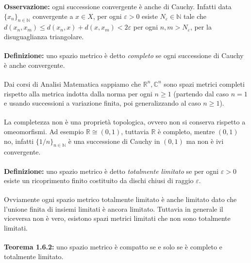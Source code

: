 \documentclass{article}
\begin{document}
\textbf{Osservazione:} ogni successione convergente è anche di Cauchy. Infatti data $\{x_n\}_{n \in \mathbb{N}}$ convergente a $x \in X$, per ogni $\varepsilon > 0$ esiste $N_\varepsilon \in \mathbb{N}$ tale che $d(x_n, x_m) \leq d(x_n, x) + d(x, x_m) < 2\varepsilon$ per ogni $n, m > N_\varepsilon$, per la disuguaglianza triangolare. \\ \\
\textbf{Definizione:} uno spazio metrico è detto \textit{completo} se ogni successione di Cauchy è anche convergente. \\ \\
Dai corsi di Analisi Matematica sappiamo che $\mathbb{R}^n, \mathbb{C}^n$ sono spazi metrici completi rispetto alla metrica indotta dalla norma per ogni $n \geq 1$ (partendo dal caso $n = 1$ e usando successioni a variazione finita, poi generalizzando al caso $n \geq 1$). \\ \\
La completezza non è una proprietà topologica, ovvero non si conserva rispetto a omeomorfismi. Ad esempio $\mathbb{R} \cong (0, 1)$, tuttavia $\mathbb{R}$ è completo, mentre $(0, 1)$ no, infatti $\{1/n\}_{n \in \mathbb{N}}$ è una successione di Cauchy in $(0, 1)$ ma non è ivi convergente. \\ \\
\textbf{Definizione:} uno spazio metrico è detto \textit{totalmente limitato} se per ogni $\varepsilon > 0$ esiste un ricoprimento finito costituito da dischi chiusi di raggio $\varepsilon$. \\ \\
Ovviamente ogni spazio metrico totalmente limitato è anche limitato dato che l'unione finita di insiemi limitati è ancora limitato. Tuttavia in generale il viceversa non è vero, esistono spazi metrici limitati che non sono totalmente limitati. \\ \\
\textbf{Teorema 1.6.2:} uno spazio metrico è compatto se e solo se è completo e totalmente limitato. \\
\end{document}
